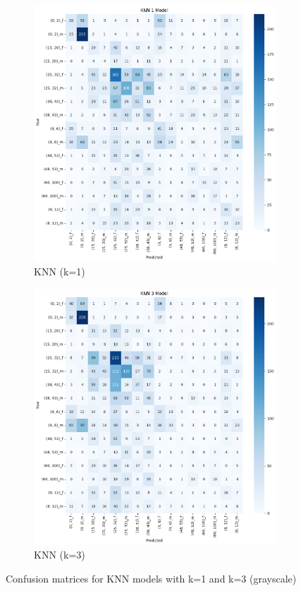 \documentclass{article}
\begin{document}
\begin{figure}[H]
    \centering
    \begin{subfigure}[b]{0.48\textwidth}
        \includegraphics[width=\textwidth]{assets/confusion_matrix/grayscale/KNN1.png}
        \caption{KNN (k=1)}
    \end{subfigure}
    \hfill
    \begin{subfigure}[b]{0.48\textwidth}
        \includegraphics[width=\textwidth]{assets/confusion_matrix/grayscale/KNN3.png}
        \caption{KNN (k=3)}
    \end{subfigure}
    \caption{Confusion matrices for KNN models with k=1 and k=3 (grayscale)}
    \label{fig:grayscale_confusion_matrices_3}
\end{figure}
\end{document}
